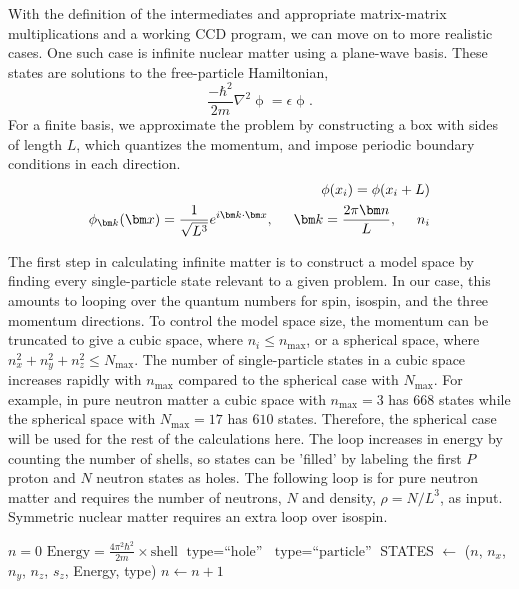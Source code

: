 With the definition of the intermediates and appropriate matrix-matrix multiplications and  a working CCD program, we can move on to more
  realistic cases. One such case is infinite nuclear matter using a
  plane-wave basis. These states are solutions to the free-particle
  Hamiltonian,
  \begin{equation}
  \frac{-\hbar^2}{2m}\nabla^2\mathop{\phi(\vec{x})}=\epsilon\mathop{\phi(\vec{x})}.
  \end{equation}
  For a finite basis, we approximate the problem by constructing a box
  with sides of length $L$, which quantizes the momentum, and impose
  periodic boundary conditions in each direction.
  \begin{align}
  \mathop{\phi(x_{i})}=\mathop{\phi(x_{i}+L)}
  \\ \mathop{\phi_{\vec{k}}(\vec{x})}=\frac{1}{\sqrt{L^{3}}}e^{i\vec{k}\cdot\vec{x}},\hspace{0.5cm}\vec{k}=\frac{2\pi\vec{n}}{L},\hspace{0.5cm}n_{i}
  \end{align}

  The first step in calculating infinite matter is to construct a
  model space by finding every single-particle state relevant to a
  given problem. In our case, this amounts to looping over the quantum
  numbers for spin, isospin, and the three momentum directions. To
  control the model space size, the momentum can be truncated to give
  a cubic space, where $n_{i}\leq n_{\text{max}}$, or a spherical
  space, where $n_{x}^{2}+n_{y}^{2}+n_{z}^{2}\leq N_{\text{max}}$. The
  number of single-particle states in a cubic space increases rapidly
  with $n_{\text{max}}$ compared to the spherical case with
  $N_{\text{max}}$. For example, in pure neutron matter a cubic space
  with $n_{\text{max}}=3$ has $668$ states while the spherical space
  with $N_{\text{max}}=17$ has $610$ states. Therefore, the spherical
  case will be used for the rest of the calculations here. The loop
  increases in energy by counting the number of shells, so states can
  be 'filled' by labeling the first $P$ proton and $N$ neutron states
  as holes. The following loop is for pure neutron matter and requires
  the number of neutrons, $N$ and density, $\rho=N/L^{3}$, as
  input. Symmetric nuclear matter requires an extra loop over isospin.

  \begin{algorithmic}
    \State $n=0$ 
     \State
    $\text{Energy}=\frac{4\pi^{2}\hbar^{2}}{2m}\times\text{shell}$
     \State $\text{type}=\text{``hole''}$ \Else \State
    $\text{type}=\text{``particle''}$ \EndIf \State STATES $\gets$
    ($n$, $n_{x}$, $n_{y}$, $n_{z}$, $s_{z}$, Energy, type) \State
    $n\gets n+1$ \EndIf \EndFor \EndFor \EndFor \EndFor \EndFor
  \end{algorithmic}

